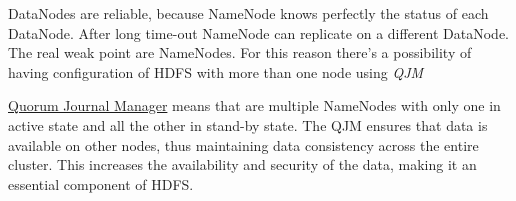 DataNodes are reliable, because NameNode knows perfectly the status of each DataNode. After long time-out NameNode can replicate on a different DataNode. The real weak point are NameNodes. For this reason there’s a possibility of having configuration of HDFS with more than one node using \textit{QJM}

\uline{Quorum Journal Manager} means that are multiple NameNodes with only one in active state and all the other in stand-by state. The QJM ensures that data is available on other nodes, thus maintaining data consistency across the entire cluster. This increases the availability and security of the data, making it an essential component of HDFS.

\newpage